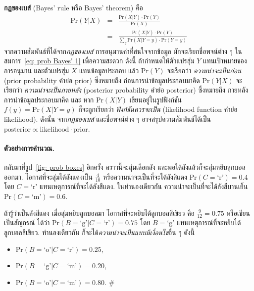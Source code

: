 \textbf{กฎของเบส์} (Bayes' rule หรือ Bayes' theorem)
คือ
\begin{eqnarray}
\mathrm{Pr}(Y|X) &=& \frac{\mathrm{Pr}(X|Y) \cdot \mathrm{Pr}(Y)}{\mathrm{Pr}(X)}
\label{eq: prob Bayes' 1} \\
&=&
\frac{\mathrm{Pr}(X|Y) \cdot \mathrm{Pr}(Y)}{\sum_y \mathrm{Pr}(X|Y=y) \cdot \mathrm{Pr}(Y=y)}
\label{eq: prob Bayes' 2}
\end{eqnarray}
จากความสัมพันธ์ที่ได้จาก\textit{กฎของเบส์}
การอนุมานค่าที่สนใจจากข้อมูล
มักจะเรียกชื่อพจน์ต่าง ๆ
ในสมการ~\ref{eq: prob Bayes' 1} เพื่อความสะดวก ดังนี้
ถ้ากำหนดให้ตัวแปรสุ่ม $Y$ แทนเป้าหมายของการอนุมาน
และตัวแปรสุ่ม $X$ แทนข้อมูลประกอบ
แล้ว
$\mathrm{Pr}(Y)$ จะเรียกว่า \textit{ความน่าจะเป็นก่อน}
(prior probability คำย่อ prior)
ซึ่งหมายถึง ก่อนการนำข้อมูลประกอบมาคิด
$\mathrm{Pr}(Y|X)$ จะเรียกว่า
\textit{ความน่าจะเป็นภายหลัง}
(posterior probability คำย่อ posterior)
ซึ่งหมายถึง ภายหลังการนำข้อมูลประกอบมาคิด
และ
หาก $\mathrm{Pr}(X|Y)$ เขียนอยู่ในรูปฟังก์ชัน $f(y) = \mathrm{Pr}(X|Y=y)$
ก็จะถูกเรียกว่า \textit{ฟังก์ชันควรจะเป็น} (likelihood function คำย่อ likelihood).
ดังนั้น จาก\textit{กฎของเบส์}
และชื่อพจน์ต่าง ๆ อาจสรุปความสัมพันธ์ได้เป็น
$\mathrm{posterior} \propto \mathrm{likelihood} \cdot \mathrm{prior}$.

\paragraph{ตัวอย่างการคำนวณ.}
กลับมาที่รูป~\ref{fig: prob boxes}
อีกครั้ง คราวนี้จะสุ่มเลือกลัง และพอได้ลังแล้วก็จะสุ่มหยิบลูกบอลออกมา.
โอกาสที่จะสุ่มได้ลังแดงเป็น $\frac{4}{10}$ หรือความน่าจะเป็นที่จะได้ลังสีแดง $\mathrm{Pr}(C = \mbox{`r'}) = 0.4$
โดย $C = \mbox{`r'}$ แทนเหตุการณ์ที่จะได้ลังสีแดง.
ในทำนองเดียวกัน ความน่าจะเป็นที่จะได้ลังสีบานเย็น $\mathrm{Pr}(C = \mbox{`m'}) = 0.6$.

ถ้ารู้ว่าเป็นลังสีแดง เมื่อสุ่มหยิบลูกบอลมา โอกาสที่จะหยิบได้ลูกบอลสีเขียว คือ $\frac{9}{12} = 0.75$ 
หรือเขียนเป็นสัญกรณ์ ได้ว่า
$\mathrm{Pr}(B = \mbox{`g'}|C = \mbox{`r'}) = 0.75$
โดย $B = \mbox{`g'}$ แทนเหตุการณ์ที่จะหยิบได้ลูกบอลสีเขียว.
ทำนองเดียวกัน ก็จะได้\textit{ความน่าจะเป็นแบบมีเงื่อนไข}อื่น ๆ ดังนี้
\begin{itemize}
	\item $\mathrm{Pr}(B = \mbox{`o'}|C = \mbox{`r'}) = 0.25$,
	\item $\mathrm{Pr}(B = \mbox{`g'}|C = \mbox{`m'}) = 0.20$, 
	\item $\mathrm{Pr}(B = \mbox{`o'}|C = \mbox{`m'}) = 0.80$.
	\hfill $\#$%
\end{itemize}

